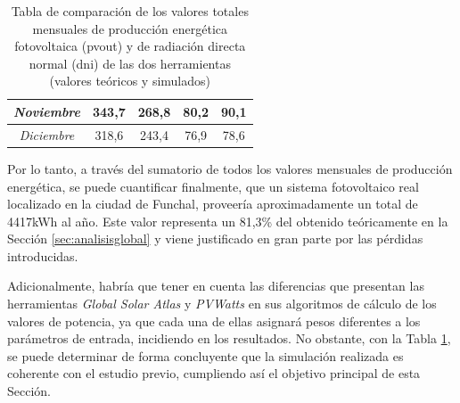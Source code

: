 \begin{table}
\begin{tabularx}{\textheight}{|c|XX|XX|}
        \textit{Noviembre} & \multicolumn{1}{c|}{343,7} & \multicolumn{1}{c|}{268,8} & \multicolumn{1}{c|}{80,2} & \multicolumn{1}{c|}{90,1} \\ \hline
        \textit{Diciembre} & \multicolumn{1}{c|}{318,6} & \multicolumn{1}{c|}{243,4} & \multicolumn{1}{c|}{76,9} & \multicolumn{1}{c|}{78,6} \\ \hline
    \end{tabularx}
    \caption{Tabla de comparación de los valores totales mensuales de producción energética fotovoltaica (\acrshort{pvout}) y de radiación directa normal (\acrshort{dni}) de las dos herramientas (valores teóricos y simulados)}
    \label{tab:globalvspvwatts}
\end{table}


\vspace{3mm}

Por lo tanto, a través del sumatorio de todos los valores mensuales de producción energética, se puede cuantificar finalmente, que un sistema fotovoltaico real localizado en la ciudad de Funchal, proveería aproximadamente un total de 4417kWh al año. Este valor representa un 81,3\% del obtenido teóricamente en la Sección \ref{sec:analisisglobal} y viene justificado en gran parte por las pérdidas introducidas. 

\vspace{3mm}

Adicionalmente, habría que tener en cuenta las diferencias que presentan las herramientas \textit{Global Solar Atlas} y \textit{PVWatts} en sus algoritmos de cálculo de los valores de potencia, ya que cada una de ellas asignará pesos diferentes a los parámetros de entrada, incidiendo en los resultados. No obstante, con la Tabla \ref{tab:globalvspvwatts}, se puede determinar de forma concluyente que la simulación realizada es coherente con el estudio previo, cumpliendo así el objetivo principal de esta Sección.

\clearpage